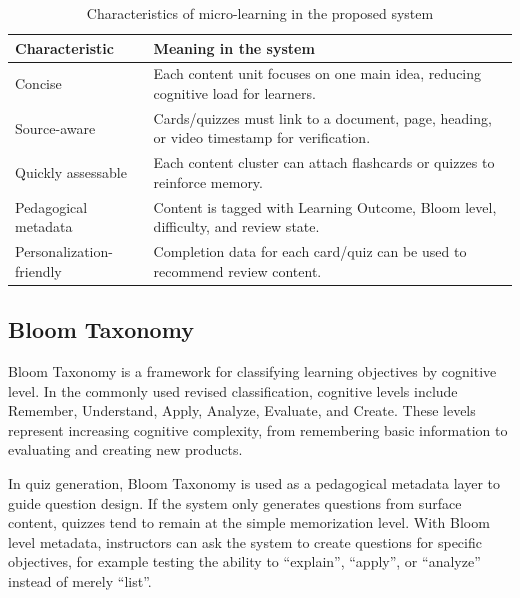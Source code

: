 \begin{table}[H]
    \centering
    \caption{Characteristics of micro-learning in the proposed system}
    \label{tab:microlearning-characteristics}
    \begin{tabular}{p{4cm}p{9.5cm}}
        \toprule
        \textbf{Characteristic} & \textbf{Meaning in the system} \\
        \midrule
        Concise & Each content unit focuses on one main idea, reducing cognitive load for learners. \\
        Source-aware & Cards/quizzes must link to a document, page, heading, or video timestamp for verification. \\
        Quickly assessable & Each content cluster can attach flashcards or quizzes to reinforce memory. \\
        Pedagogical metadata & Content is tagged with Learning Outcome, Bloom level, difficulty, and review state. \\
        Personalization-friendly & Completion data for each card/quiz can be used to recommend review content. \\
        \bottomrule
    \end{tabular}
\end{table}

\subsection{Bloom Taxonomy}
\label{subsec:bloom-taxonomy}

Bloom Taxonomy is a framework for classifying learning objectives by
cognitive level. In the commonly used revised classification, cognitive
levels include Remember, Understand, Apply, Analyze, Evaluate, and
Create. These levels represent increasing cognitive complexity, from
remembering basic information to evaluating and creating new products.

In quiz generation, Bloom Taxonomy is used as a pedagogical metadata
layer to guide question design. If the system only generates questions
from surface content, quizzes tend to remain at the simple memorization
level. With Bloom level metadata, instructors can ask the system to
create questions for specific objectives, for example testing the ability
to ``explain'', ``apply'', or ``analyze'' instead of merely ``list''.

